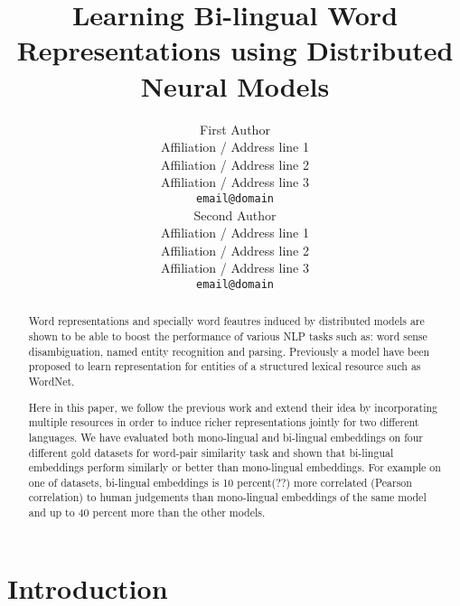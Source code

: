 \documentclass[11pt]{article}
\title{Learning Bi-lingual Word Representations using Distributed Neural Models}
\author{First Author \\
  Affiliation / Address line 1 \\
  Affiliation / Address line 2 \\
  Affiliation / Address line 3 \\
  {\tt email@domain} \\\And
  Second Author \\
  Affiliation / Address line 1 \\
  Affiliation / Address line 2 \\
  Affiliation / Address line 3 \\
  {\tt email@domain} \\}
\date{}
\begin{document}
\maketitle
\begin{abstract}
  Word representations and specially word feautres induced by distributed models
  are shown to be able to boost the performance of various NLP tasks such as: 
  word sense disambiguation, named entity recognition and parsing.
  Previously a model have been proposed  to learn
  representation for entities of a structured lexical resource such as WordNet.
  
  Here in this paper, we follow the previous work and extend their idea by
  incorporating multiple resources  in order to induce richer representations jointly for two different languages.  
  We have evaluated both mono-lingual  and bi-lingual embeddings on four
  different gold datasets for word-pair similarity task and shown that bi-lingual embeddings perform similarly or better than mono-lingual embeddings. 
For example on one of datasets, bi-lingual embeddings is 10 percent(??) more
correlated (Pearson correlation) to human judgements  than mono-lingual embeddings of the same model and up to 40 percent more than the other models.

\end{abstract}


\section{Introduction}
\end{document}
